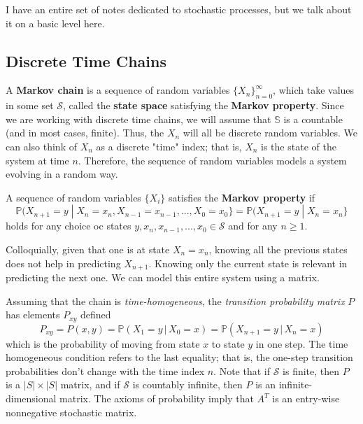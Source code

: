 \documentclass{article}
\begin{document}
  I have an entire set of notes dedicated to stochastic processes, but we talk about it on a basic level here. 

  \subsection{Discrete Time Chains}

    \begin{definition}
      A \textbf{Markov chain} is a sequence of random variables $\{X_n\}_{n=0}^\infty$, which take values in some set $\mathcal{S}$, called the \textbf{state space} satisfying the \textbf{Markov property}. Since we are working with discrete time chains, we will assume that $\mathbb{S}$ is a countable (and in most cases, finite). Thus, the $X_n$ will all be discrete random variables. We can also think of $X_n$ as a discrete "time" index; that is, $X_n$ is the state of the system at time $n$. Therefore, the sequence of random variables models a system evolving in a random way. 
    \end{definition}

    \begin{definition}
      A sequence of random variables $\{X_i\}$ satisfies the \textbf{Markov property} if 
      \begin{equation}
        \mathbb{P}(X_{n+1} = y \; | \; X_n = x_n, X_{n-1} = x_{n-1}, ..., X_0 = x_0\} = \mathbb{P}(X_{n+1} = y \; | \; X_n = x_n\}
      \end{equation}
      holds for any choice oc states $y, x_n, x_{n-1}, ..., x_0 \in \mathcal{S}$ and for any $n \geq 1$. 
    \end{definition}

    Colloquially, given that one is at state $X_n = x_n$, knowing all the previous states does not help in predicting $X_{n+1}$. Knowing only the current state is relevant in predicting the next one. We can model this entire system using a matrix. 

    \begin{definition}
      Assuming that the chain is \textit{time-homogeneous}, the \textit{transition probability matrix} $P$ has elements $P_{x y}$ defined
      \begin{equation}
        P_{x y} = P(x, y) = \mathbb{P}(X_1 = y \,|\, X_0 = x) = \mathbb{P}(X_{n+1} = y \,|\, X_n = x)
      \end{equation}
      which is the probability of moving from state $x$ to state $y$ in one step. The time homogeneous condition refers to the last equality; that is, the one-step transition probabilities don't change with the time index $n$. Note that if $\mathcal{S}$ is finite, then $P$ is a $|S| \times |S|$ matrix, and if $\mathcal{S}$ is countably infinite, then $P$ is an infinite-dimensional matrix. The axioms of probability imply that $A^T$ is an entry-wise nonnegative stochastic matrix.
    \end{definition}
\end{document}
